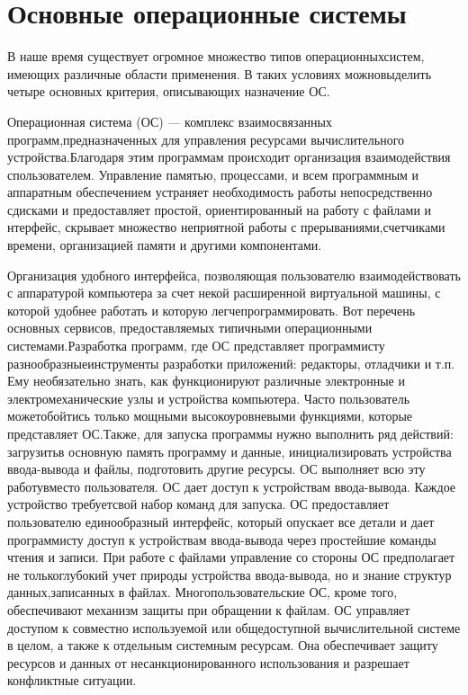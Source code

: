 \section{Основные операционные системы}

В наше время существует огромное множество типов операционныхсистем, имеющих различные области применения. В таких условиях можновыделить четыре основных критерия, описывающих назначение ОС.

Операционная система (ОС) — комплекс взаимосвязанных программ,предназначенных   для   управления   ресурсами   вычислительного   устройства.Благодаря   этим   программам   происходит   организация   взаимодействия   спользователем.  Управление   памятью,   процессами,   и   всем   программным   и аппаратным обеспечением устраняет необходимость работы непосредственно сдисками и предоставляет простой, ориентированный на работу с файлами и нтерфейс,   скрывает   множество   неприятной   работы   с   прерываниями,счетчиками времени, организацией памяти и другими компонентами.~\cite{Oc1}

Организация   удобного   интерфейса,   позволяющая   пользователю взаимодействовать   с  аппаратурой   компьютера   за   счет   некой   расширенной виртуальной   машины,   с   которой   удобнее   работать   и   которую   легчепрограммировать.   Вот   перечень   основных   сервисов,   предоставляемых типичными операционными системами.Разработка программ, где ОС представляет программисту разнообразныеинструменты разработки приложений: редакторы, отладчики и т.п. Ему необязательно   знать,   как   функционируют   различные   электронные   и электромеханические узлы и устройства компьютера. Часто пользователь можетобойтись   только   мощными   высокоуровневыми   функциями,   которые представляет ОС.Также, для запуска программы нужно выполнить ряд действий: загрузитьв основную память программу и данные, инициализировать устройства ввода-вывода и файлы, подготовить другие ресурсы. ОС выполняет всю эту работувместо пользователя. ОС дает доступ к устройствам ввода-вывода. Каждое устройство требуетсвой набор команд для запуска. ОС предоставляет пользователю единообразный интерфейс,   который   опускает   все   детали   и   дает   программисту   доступ   к устройствам ввода-вывода через простейшие команды чтения и записи. При работе с файлами управление со стороны ОС предполагает не толькоглубокий учет природы устройства ввода-вывода, но и знание структур данных,записанных в файлах. Многопользовательские ОС, кроме того, обеспечивают механизм защиты при обращении к файлам. ОС управляет доступом к совместно используемой или общедоступной вычислительной системе в целом, а также к отдельным системным ресурсам. Она   обеспечивает   защиту   ресурсов   и   данных   от   несанкционированного использования и разрешает конфликтные ситуации.

